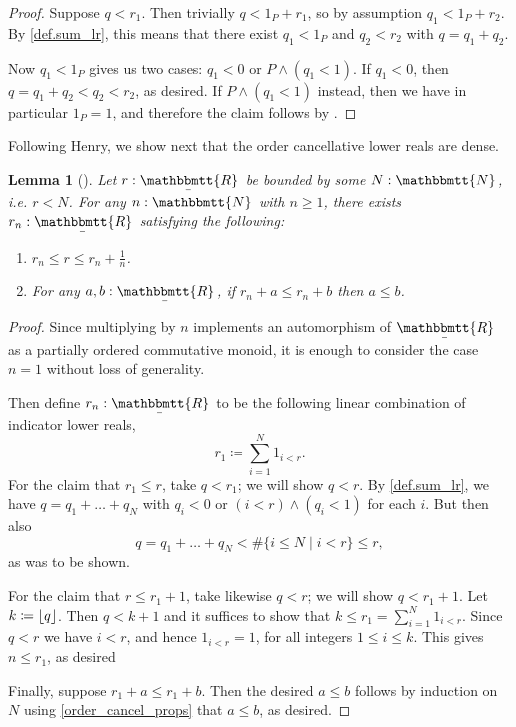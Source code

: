 \documentclass[reqno,11pt]{amsproc}
\theoremstyle{plain}
\newtheorem{lemma}[theorem]{Lemma}
\theoremstyle{definition}
\DeclarePairedDelimiter{\floor}{\lfloor}{\rfloor}
\newcommand{\ubar}[1]{\underaccent{\bar}{#1}}
\newcommand{\ind}[1]{1_{#1}}			%
\newcommand{\internal}[1]{\raisebox{-.03ex}{$\mathbbmtt{#1}$}}
\newcommand{\hs}{\hspace{1pt}}
\newcommand{\tnn}{\internal{N}\hs}
\newcommand{\trr}{\internal{R}}
\newcommand{\tlrr}{\ubar{\trr}\hs}
\numberwithin{equation}{section}
\begin{document}
\begin{proof}
Suppose $q < r_1$. Then trivially $q < \ind{P} + r_1$, so by assumption $q_1<\ind{P}+r_2$. By \cref{def.sum_lr}, this means that there exist $q_1 < \ind{P}$ and $q_2 < r_2$ with $q = q_1 + q_2$.

Now $q_1 < \ind{P}$ gives us two cases: $q_1 < 0$ or $P \land (q_1 < 1)$. If $q_1 < 0$, then $q = q_1 + q_2 < q_2 < r_2$, as desired. If $P \land (q_1 < 1)$ instead, then we have in particular $1_P = 1$, and therefore the claim follows by .
\end{proof}

Following Henry, we show next that the order cancellative lower reals are dense.

\begin{lemma}[\cite{henry2012simplification}]
\label{cancellative_bounds}
	Let $r:\tlrr$ be bounded by some $N:\tnn$, i.e. $r<N$. For any $n:\tnn$ with $n\ge 1$, there exists $r_n:\tlrr$ satisfying the following:
	\begin{enumerate}
		\item $r_n\le r\le r_n + \frac{1}{n}$.
		\item For any $a,b:\tlrr$, if $r_n+a\le r_n+b$ then $a\le b$.
	\end{enumerate}
\end{lemma}

\begin{proof}
	Since multiplying by $n$ implements an automorphism of $\tlrr$ as a partially ordered commutative monoid, it is enough to consider the case $n = 1$ without loss of generality.

	Then define $r_n:\tlrr$ to be the following linear combination of indicator lower reals,
	\begin{equation}
		\label{eqn.cancellative_bounds}
		r_1 \coloneqq \sum_{i=1}^{N} \ind{i < r}.
	\end{equation}
	For the claim that $r_1\le r$, take $q < r_1$; we will show $q < r$. By \cref{def.sum_lr}, we have $q = q_1 + \ldots + q_N$ with $q_i < 0$ or $(i < r) \land (q_i < 1)$ for each $i$. But then also
	\[
		q = q_1 + \ldots + q_N < \#\{ i \le N \mid i < r \} \le r,
	\]
	as was to be shown.

	For the claim that $r\le r_1+1$, take likewise $q<r$; we will show $q < r_1 + 1$. Let $k \coloneqq \floor{q}$.  Then $q < k + 1$ and it suffices to show that $k \le r_1 = \sum_{i=1}^{N} \ind{i < r}$. Since $q < r$ we have $i < r$, and hence $\ind{i < r} = 1$, for all integers $1\le i\le k$. This gives $n\le r_1$, as desired

	Finally, suppose $r_1 + a \le r_1 + b$. Then the desired $a \le b$ follows by induction on $N$ using \cref{order_cancel_props} that $a\le b$, as desired.
\end{proof}
\end{document}
